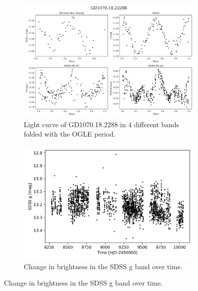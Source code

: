 \documentclass{pracalicmgr}
\begin{document}
\begin{figure}%
    \centering
    \begin{subfigure}{1\textwidth}
       \includegraphics[width=1\linewidth]{plots/GD1070.18.22288/lc_comparsion.png}
       \caption{Light curve of GD1070.18.2288 in $4$ different bands folded with the OGLE period.}\label{comp}
       \label{fig:Ng1} 
    \end{subfigure}
    
    \begin{subfigure}{1\textwidth}
       \includegraphics[width=1\linewidth]{plots/GD1070.18.22288/visibility_over_time.png}
       \caption{Change in brightness in the SDSS g band over time.}\label{evolution}
    \end{subfigure}
\end{figure}
\end{document}
